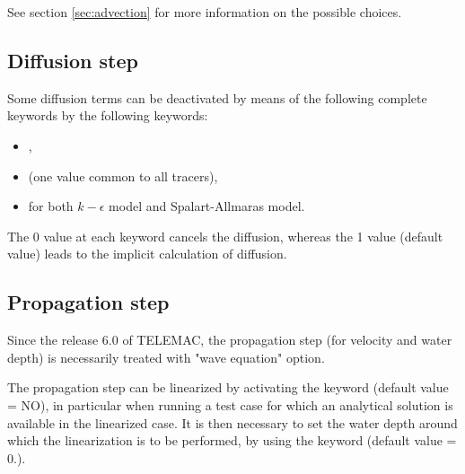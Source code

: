 See section \ref{sec:advection} for more information on the possible choices.

\subsection{Diffusion step}
\label{sec:difstep}

Some diffusion terms can be deactivated by means of the following complete
keywords by the following keywords:

\begin{itemize}
\item {},

\item {} (one value common to all tracers),

\item {} for both $k-\epsilon$ model
and Spalart-Allmaras model.
\end{itemize}

The 0 value at each keyword cancels the diffusion, whereas the 1 value
(default value) leads to the implicit calculation of diffusion.



\subsection{Propagation step}


Since the release 6.0 of TELEMAC, the propagation step (for velocity and water
depth) is necessarily treated with  "wave equation" option.

The propagation step can be linearized by activating the keyword
 (default value = NO), in particular when running
a test case for which an analytical solution is available in the linearized case.
It is then necessary to set the water depth around which the
linearization is to be performed, by using the keyword
 (default value = 0.).

